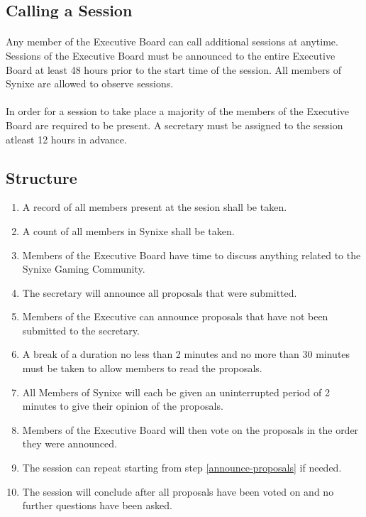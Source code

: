 \documentclass[10pt,a4paper]{article}
\begin{document}
\subsection{Calling a Session}
\paragraph{}
Any member of the Executive Board can call additional sessions at anytime. Sessions of the Executive Board must be announced to the entire Executive Board at least 48 hours prior to the start time of the session. All members of Synixe are allowed to observe sessions.
\paragraph{}
In order for a session to take place a majority of the members of the Executive Board are required to be present. A secretary must be assigned to the session atleast 12 hours in advance.
\subsection{Structure}
\begin{enumerate}
	\item A record of all members present at the sesion shall be taken.
	\item A count of all members in Synixe shall be taken.
	\item Members of the Executive Board have time to discuss anything related to the Synixe Gaming Community.
	\item The secretary will announce all proposals that were submitted.
	\item\label{announce-proposals} Members of the Executive can announce proposals that have not been submitted to the secretary.
	\item A break of a duration no less than 2 minutes and no more than 30 minutes must be taken to allow members to read the proposals.
	\item All Members of Synixe will each be given an uninterrupted period of 2 minutes to give their opinion of the proposals.
	\item Members of the Executive Board will then vote on the proposals in the order they were announced.
	\item The session can repeat starting from step \ref{announce-proposals} if needed.
	\item The session will conclude after all proposals have been voted on and no further questions have been asked.
\end{enumerate}
\end{document}

